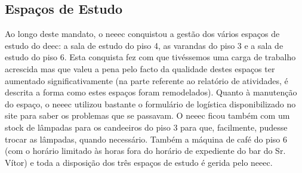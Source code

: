 
\subsection{Espaços de Estudo}

Ao longo deste mandato, o \acrshort{neeec} conquistou a gestão dos vários espaços de estudo do \acrshort{deec}: a sala de estudo do piso 4, as varandas do piso 3 e a sala de estudo do piso 6. Esta conquista fez com que tivéssemos uma carga de trabalho acrescida mas que valeu a pena pelo facto da qualidade destes espaços ter aumentado significativamente (na parte referente ao relatório de atividades, é descrita a forma como estes espaços foram remodelados). Quanto à manutenção do espaço, o \acrshort{neeec} utilizou bastante o formulário de logística disponibilizado no site para saber os problemas que se passavam. O \acrshort{neeec} ficou também com um stock de lâmpadas para os candeeiros do piso 3 para que, facilmente, pudesse trocar as lâmpadas, quando necessário. Também a máquina de café do piso 6 (com o horário limitado às horas fora do horário de expediente do bar do Sr. Vítor) e toda a disposição dos três espaços de estudo é gerida pelo \acrshort{neeec}.